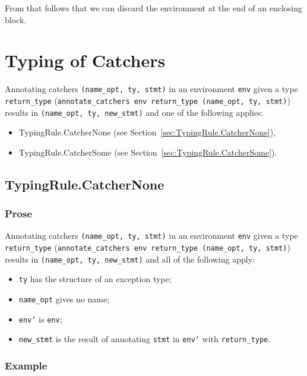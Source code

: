 \documentclass{book}
\begin{document}
    From that follows that we can discard the environment at the end of
an enclosing block.
 
\chapter{Typing of Catchers}

Annotating catchers \texttt{(name\_opt, ty, stmt)} in an environment
\texttt{env} given a type \texttt{return\_type} (\texttt{annotate\_catchers env
return\_type (name\_opt, ty, stmt)}) results in \texttt{(name\_opt, ty,
new\_stmt)} and one of the following applies:
\begin{itemize}
\item TypingRule.CatcherNone (see Section~\ref{sec:TypingRule.CatcherNone}),
\item TypingRule.CatcherSome (see Section~\ref{sec:TypingRule.CatcherSome}).
\end{itemize}
   
\section{TypingRule.CatcherNone \label{sec:TypingRule.CatcherNone}}

  \subsection{Prose}
   Annotating catchers \texttt{(name\_opt, ty, stmt)} in an environment
\texttt{env} given a type \texttt{return\_type} (\texttt{annotate\_catchers env
return\_type (name\_opt, ty, stmt)}) results in \texttt{(name\_opt, ty,
new\_stmt)} and all of the following apply:
   \begin{itemize}
   \item \texttt{ty} has the structure of an exception type;
   \item \texttt{name\_opt} gives no name;
   \item \texttt{env'} is \texttt{env};
   \item \texttt{new\_stmt} is the result of annotating \texttt{stmt} in \texttt{env'} with \texttt{return\_type}.
   \end{itemize}

  \subsection{Example}
\end{document}
